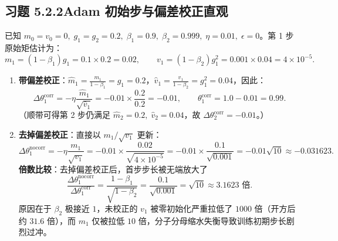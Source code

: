 \subsection*{习题 5.2.2\quad Adam 初始步与偏差校正直观}
已知 $m_0 = v_0 = 0,\; g_1 = g_2 = 0.2,\; \beta_1 = 0.9,\; \beta_2 = 0.999,\; \eta = 0.01,\; \epsilon = 0$。第 1 步原始矩估计为：
\[
  m_1 = (1 - \beta_1) g_1 = 0.1 \times 0.2 = 0.02, \qquad
  v_1 = (1 - \beta_2) g_1^2 = 0.001 \times 0.04 = 4 \times 10^{-5}.
\]
\begin{enumerate}[label=(\alph*), leftmargin=1.8em]
  \item \textbf{带偏差校正}：$\hat{m}_1 = \frac{m_1}{1-\beta_1} = g_1 = 0.2$，$\hat{v}_1 = \frac{v_1}{1-\beta_2} = g_1^2 = 0.04$，因此：
  \[
    \Delta \theta_1^{\text{corr}} = -\eta \frac{\hat{m}_1}{\sqrt{\hat{v}_1}} = -0.01 \times \frac{0.2}{0.2} = -0.01, \qquad
    \theta_1^{\text{corr}} = 1.0 - 0.01 = 0.99.
  \]
  （顺带可得第 2 步仍满足 $\hat{m}_2 = 0.2,\; \hat{v}_2 = 0.04$，故 $\Delta \theta_2^{\text{corr}} = -0.01$。）

  \item \textbf{去掉偏差校正}：直接以 $m_1 / \sqrt{v_1}$ 更新：
  \[
    \Delta \theta_1^{\text{nocorr}}
    = -\eta \frac{m_1}{\sqrt{v_1}}
    = -0.01 \times \frac{0.02}{\sqrt{4 \times 10^{-5}}}
    = -0.01 \times \frac{0.1}{\sqrt{0.001}}
    = -0.01\sqrt{10} \approx -0.031623.
  \]
  \textbf{倍数比较}：去掉偏差校正后，首步步长被无端放大了
  \[
    \frac{\Delta \theta_1^{\text{nocorr}}}{\Delta \theta_1^{\text{corr}}}
    = \frac{1 - \beta_1}{\sqrt{1 - \beta_2}}
    = \frac{0.1}{\sqrt{0.001}} = \sqrt{10} \approx 3.1623\text{ 倍}.
  \]
  原因在于 $\beta_2$ 极接近 $1$，未校正的 $v_1$ 被零初始化严重拉低了 $1000$ 倍（开方后约 $31.6$ 倍），而 $m_1$ 仅被拉低 $10$ 倍，分子分母缩水失衡导致训练初期步长剧烈过冲。
\end{enumerate}

